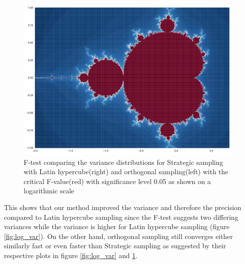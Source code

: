 \documentclass{uva-inf-article}
\begin{document}
\begin{figure}[h!]
  \centering
  \includegraphics[width=.85\textwidth]{graphs/fractal.pdf}
  \caption{F-test comparing the variance distributions for Strategic sampling with Latin hypercube(right) and orthogonal sampling(left) with the critical F-value(red) with significance level 0.05 as shown on a logarithmic scale}
  \label{fig:f_test}
\end{figure}

This shows that our method improved the variance and therefore the precision compared to Latin hypercube sampling since the F-test suggests two differing variances while the variance is higher for Latin hypercube sampling (figure \ref{fig:log_var}). On the other hand, orthogonal sampling still converges either similarly fast or even faster than Strategic sampling as suggested by their respective plots in figure \ref{fig:log_var} and \ref{fig:f_test}.


\newpage
\end{document}
